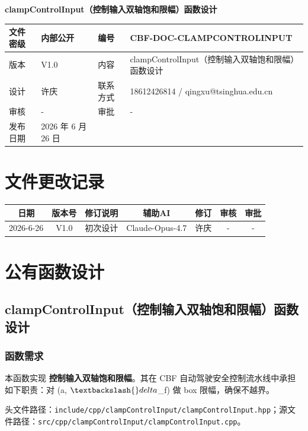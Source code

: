 \documentclass[a4paper,10pt]{article}
\begin{document}
\begin{titlepage}
    \centering
    {\Huge\textbf{clampControlInput（控制输入双轴饱和限幅）函数设计}\par}
    \vspace{1.5cm}
    \renewcommand{\arraystretch}{1.5}
    \begin{tabular}{|l|l|l|l|}
        \hline
        文件密级 & 内部公开 & 编号 & CBF-DOC-CLAMPCONTROLINPUT \\ \hline
        版本 & V1.0 & 内容 & clampControlInput（控制输入双轴饱和限幅）函数设计 \\ \hline
        设计 & 许庆 & 联系方式 & 18612426814 / qingxu@tsinghua.edu.cn \\ \hline
        审核 & - & 审批 & - \\ \hline
        发布日期 & 2026 年 6 月 26 日 & & \\ \hline
    \end{tabular}
    \vspace{1.5cm}
    \section*{文件更改记录}
    \begin{longtable}{|c|c|p{4cm}|c|c|c|c|}
        \hline
        日期 & 版本号 & 修订说明 & 辅助AI & 修订 & 审核 & 审批 \\ \hline
        2026-6-26 & V1.0 & 初次设计 & Claude-Opus-4.7 & 许庆 & - & - \\ \hline
    \end{longtable}
\end{titlepage}
\tableofcontents
\newpage
\section{公有函数设计}
\subsection{clampControlInput（控制输入双轴饱和限幅）函数设计}
\subsubsection{函数需求}
\par 本函数实现 \textbf{控制输入双轴饱和限幅}。其在 CBF 自动驾驶安全控制流水线中承担如下职责：对 (a, $\textbackslash{}delta$\_f) 做 box 限幅，确保不越界。
\par 头文件路径：\texttt{include/cpp/clampControlInput/clampControlInput.hpp}；源文件路径：\texttt{src/cpp/clampControlInput/clampControlInput.cpp}。
\end{document}
